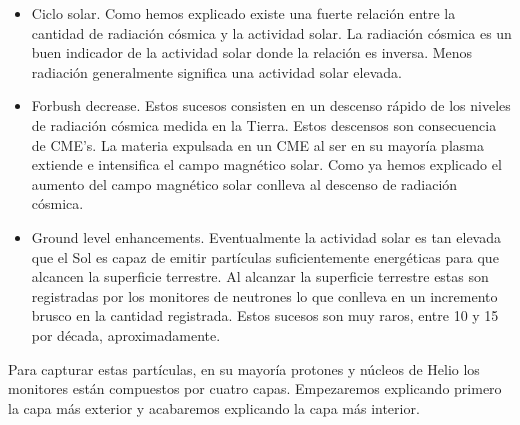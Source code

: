 	\begin{itemize}
	  	\item	Ciclo solar. Como hemos explicado existe una fuerte relación entre la cantidad de radiación cósmica y la actividad solar. 
		  	La radiación cósmica es un buen indicador de la actividad solar donde la relación es inversa. Menos radiación generalmente
			significa una actividad solar elevada.	
		\item	Forbush decrease\cite{Forbush1938}. Estos sucesos consisten en un descenso rápido de los niveles de radiación cósmica medida en la Tierra. Estos
		  	descensos son consecuencia de CME's. La materia expulsada en un CME al ser en su mayoría plasma extiende e intensifica el 	
			campo magnético solar. Como ya hemos explicado el aumento del campo magnético solar conlleva al descenso de radiación cósmica. 
		\item	Ground level enhancements. Eventualmente la actividad solar es tan elevada que el Sol es capaz de emitir partículas
		  	suficientemente energéticas para que alcancen la superficie terrestre. Al alcanzar la superficie terrestre estas son 
			registradas por los monitores de neutrones lo que conlleva en un incremento brusco en la cantidad registrada. Estos sucesos
			son muy raros, entre 10 y 15 por década, aproximadamente.  
	\end{itemize}
	Para capturar estas partículas, en su mayoría protones y núcleos de Helio los monitores están compuestos por cuatro capas. Empezaremos 
	explicando primero la capa más exterior y acabaremos explicando la capa más interior.
